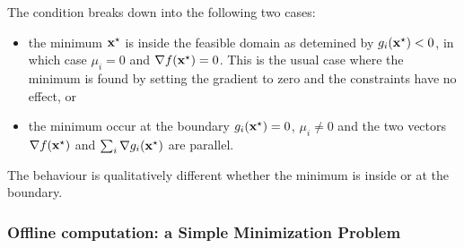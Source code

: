 The condition breaks down into the following two cases:
\begin{itemize}
\item the minimum $\boldsymbol{\mathrm{x}}^\star$ is inside the feasible domain as   detemined by $g_i(\boldsymbol{\mathrm{x}}^\star) < 0$, in which case $\mu_i=0$ and   $\nabla f(\boldsymbol{\mathrm{x}}^\star) = 0$. This is the usual case where the minimum   is found by setting the gradient to zero and the constraints have no   effect, or
\item the minimum occur at the boundary $g_i(\boldsymbol{\mathrm{x}}^\star) = 0$,   $\mu_i\neq 0$ and the two vectors $\nabla f(\boldsymbol{\mathrm{x}}^\star)$ and   $\sum_i \nabla g_i(\boldsymbol{\mathrm{x}}^\star)$ are parallel.
\end{itemize}
The behaviour is qualitatively different whether the minimum is inside or at the boundary.


\subsubsection{Offline computation: a Simple Minimization Problem}


